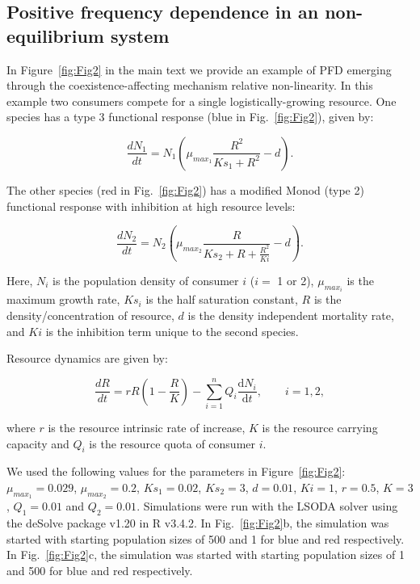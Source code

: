 \subsection{Positive frequency dependence in an non-equilibrium system}
In Figure~\ref{fig:Fig2} in the main text we provide an example of PFD emerging through the coexistence-affecting mechanism relative non-linearity. In this example two consumers compete for a single logistically-growing resource. One species has a type 3 functional response (blue in Fig.~\ref{fig:Fig2}), given by: 

\begin{equation}
\frac{dN_{1}}{dt} = N_{1}(\mu _{max_{1}}\frac{R^2}{Ks_{1} + R^2}-d).
\tag{S3.3.1}\label{eq:S3.3.1}
\end{equation}

\noindent The other species (red in Fig.~\ref{fig:Fig2}) has a modified Monod (type 2) functional response with inhibition at high resource levels: 

\begin{equation}
\frac{dN_{2}}{dt} = N_{2}(\mu _{max_{2}}\frac{R}{Ks_{2} + R + \frac{R^2}{Ki}}-d).
\tag{S3.3.2}\label{eq:S3.3.2}
\end{equation}

\noindent Here, $N_{i}$ is the population density of consumer $i$ ($i = $ 1 or 2), $\mu_{max_{i}}$ is the maximum growth rate, $Ks_{i}$ is the half saturation constant, $R$ is the density/concentration of resource, $d$ is the density independent mortality rate, and $Ki$ is the inhibition term unique to the second species. 
\par


\noindent Resource dynamics are given by:

\begin{equation}
\frac{dR}{dt} = rR(1-\frac{R}{K}) - \sum_{i = 1}^{n} Q_{i}\frac{\mathrm{d}N_{i}}{\mathrm{d}t},\qquad i = 1,2, 
\tag{S3.3.3}\label{eq:S3.3.3}
\end{equation}

\noindent where $r$ is the resource intrinsic rate of increase, $K$ is the resource carrying capacity and $Q_{i}$ is the resource quota of consumer $i$. 
\par


We used the following values for the parameters in Figure~\ref{fig:Fig2}: $\mu_{max_{1}} = 0.029$, $\mu_{max_{2}} = 0.2$, $Ks_{1} = 0.02$, $Ks_{2} = 3$, $d = 0.01$, $Ki = 1$, $r = 0.5$, $K = 3$, $Q_{1} = 0.01$ and $Q_{2} = 0.01$. Simulations were run with the LSODA solver using the deSolve package v1.20 \citep{soetaert2016package} in R v3.4.2. In Fig.~\ref{fig:Fig2}b, the simulation was started with starting population sizes of 500 and 1 for blue and red respectively. In Fig.~\ref{fig:Fig2}c, the simulation was started with starting population sizes of 1 and 500 for blue and red respectively. 

